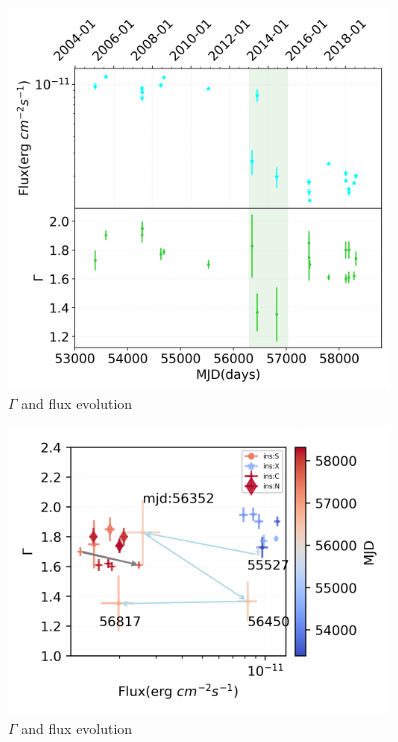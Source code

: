 \documentclass{aastex63}
\begin{document}
\begin{figure}
\centering
	\includegraphics[width=0.9\textwidth]{./pic/subplots-xrayappendgood-fandg-second.png}
    \caption{$\Gamma$ and flux evolution}
    \label{fig:xrayappendgood-fandg-secondaxis}
\end{figure}

\begin{figure}
\centering
	\includegraphics[width=0.9\textwidth]{./pic/xrayappendgood-errorbar-f-g-tmap.png}
    \caption{$\Gamma$ and flux evolution}
    \label{fig:xrayappendgood-fandg-tmap}
\end{figure}
\end{document}
